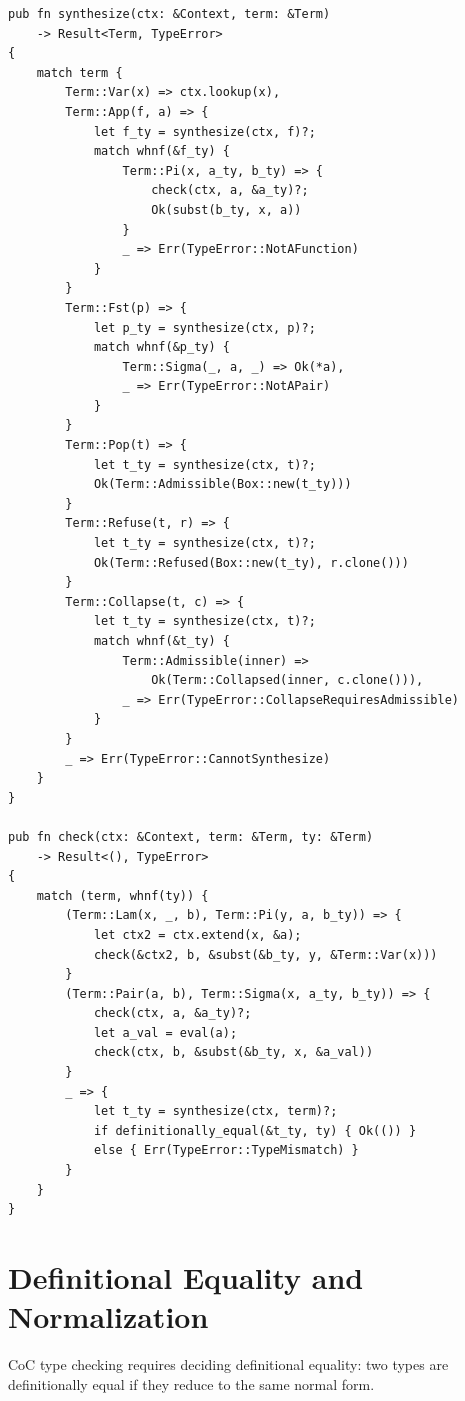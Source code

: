 \documentclass[12pt, a4paper, openany]{book}
\theoremstyle{plain}
\theoremstyle{definition}
\theoremstyle{remark}
\begin{document}
\begin{lstlisting}[style=rust, caption={Bidirectional type checker core}]
pub fn synthesize(ctx: &Context, term: &Term)
    -> Result<Term, TypeError>
{
    match term {
        Term::Var(x) => ctx.lookup(x),
        Term::App(f, a) => {
            let f_ty = synthesize(ctx, f)?;
            match whnf(&f_ty) {
                Term::Pi(x, a_ty, b_ty) => {
                    check(ctx, a, &a_ty)?;
                    Ok(subst(b_ty, x, a))
                }
                _ => Err(TypeError::NotAFunction)
            }
        }
        Term::Fst(p) => {
            let p_ty = synthesize(ctx, p)?;
            match whnf(&p_ty) {
                Term::Sigma(_, a, _) => Ok(*a),
                _ => Err(TypeError::NotAPair)
            }
        }
        Term::Pop(t) => {
            let t_ty = synthesize(ctx, t)?;
            Ok(Term::Admissible(Box::new(t_ty)))
        }
        Term::Refuse(t, r) => {
            let t_ty = synthesize(ctx, t)?;
            Ok(Term::Refused(Box::new(t_ty), r.clone()))
        }
        Term::Collapse(t, c) => {
            let t_ty = synthesize(ctx, t)?;
            match whnf(&t_ty) {
                Term::Admissible(inner) =>
                    Ok(Term::Collapsed(inner, c.clone())),
                _ => Err(TypeError::CollapseRequiresAdmissible)
            }
        }
        _ => Err(TypeError::CannotSynthesize)
    }
}

pub fn check(ctx: &Context, term: &Term, ty: &Term)
    -> Result<(), TypeError>
{
    match (term, whnf(ty)) {
        (Term::Lam(x, _, b), Term::Pi(y, a, b_ty)) => {
            let ctx2 = ctx.extend(x, &a);
            check(&ctx2, b, &subst(&b_ty, y, &Term::Var(x)))
        }
        (Term::Pair(a, b), Term::Sigma(x, a_ty, b_ty)) => {
            check(ctx, a, &a_ty)?;
            let a_val = eval(a);
            check(ctx, b, &subst(&b_ty, x, &a_val))
        }
        _ => {
            let t_ty = synthesize(ctx, term)?;
            if definitionally_equal(&t_ty, ty) { Ok(()) }
            else { Err(TypeError::TypeMismatch) }
        }
    }
}
\end{lstlisting}

\section{Definitional Equality and Normalization}

CoC type checking requires deciding definitional equality: two types are
definitionally equal if they reduce to the same normal form.
\end{document}
